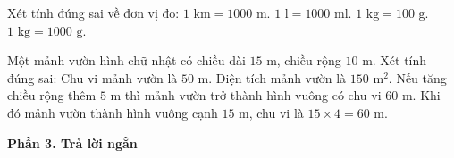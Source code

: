 \begin{ex} %
Xét tính đúng sai về đơn vị đo:
\choiceTF
{\True $1\text{ km} = 1000\text{ m}$.}
{\True $1\text{ l} = 1000\text{ ml}$.}
{$1\text{ kg} = 100\text{ g}$.}
{\True $1\text{ kg} = 1000\text{ g}$.}
\end{ex}

\begin{ex} %
Một mảnh vườn hình chữ nhật có chiều dài $15\text{ m}$, chiều rộng $10\text{ m}$. Xét tính đúng sai:
\choiceTF
{\True Chu vi mảnh vườn là $50\text{ m}$.}
{\True Diện tích mảnh vườn là $150\text{ m}^2$.}
{Nếu tăng chiều rộng thêm $5\text{ m}$ thì mảnh vườn trở thành hình vuông có chu vi $60\text{ m}$.}
{\True Khi đó mảnh vườn thành hình vuông cạnh $15\text{ m}$, chu vi là $15 \times 4 = 60\text{ m}$.}
\end{ex}

\textbf{Phần 3. Trả lời ngắn}


